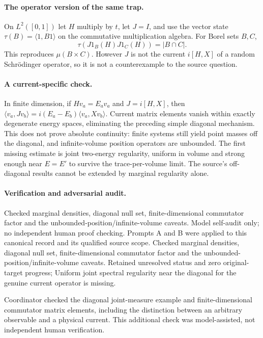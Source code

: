 \documentclass[11pt]{article}
\begin{document}
\paragraph{The operator version of the same trap.} On $L^2([0,1])$ let $H$ multiply by $t$, let $J=I$, and use the vector state $\tau(B)=\langle1,B1\rangle$ on the commutative multiplication algebra. For Borel sets $B,C$,
\[
 \tau(J1_B(H)J1_C(H))=|B\cap C|.
\]
This reproduces $\mu(B\times C)$. However $J$ is not the current $i[H,X]$ of a random Schrödinger operator, so it is not a counterexample to the source question.

\paragraph{A current-specific check.} In finite dimension, if $Hv_a=E_av_a$ and $J=i[H,X]$, then $\langle v_a,Jv_b\rangle=i(E_a-E_b)\langle v_a,Xv_b\rangle$. Current matrix elements vanish within exactly degenerate energy spaces, eliminating the preceding simple diagonal mechanism. This does not prove absolute continuity: finite systems still yield point masses off the diagonal, and infinite-volume position operators are unbounded. The first missing estimate is joint two-energy regularity, uniform in volume and strong enough near $E=E'$ to survive the trace-per-volume limit. The source's off-diagonal results cannot be extended by marginal regularity alone.

\paragraph{Verification and adversarial audit.}
Checked marginal densities, diagonal null set, finite-dimensional commutator factor and the unbounded-position/infinite-volume caveats. Model self-audit only; no independent human proof checking. Prompts A and B were applied to this canonical record and its qualified source scope. Checked marginal densities, diagonal null set, finite-dimensional commutator factor and the unbounded-position/infinite-volume caveats. Retained unresolved status and zero original-target progress; Uniform joint spectral regularity near the diagonal for the genuine current operator is missing.

Coordinator checked the diagonal joint-measure example and finite-dimensional commutator matrix elements, including the distinction between an arbitrary observable and a physical current. This additional check was model-assisted, not independent human verification.
\end{document}
